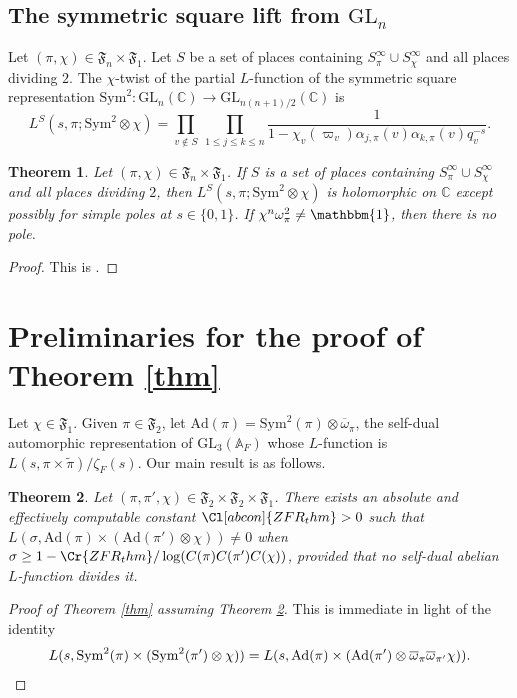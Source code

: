 \documentclass[11pt]{amsart}
\newtheorem{theorem}{Theorem}[section]
\theoremstyle{remark}
\numberwithin{equation}{section}
\begin{document}
\subsection{The symmetric square lift from $\mathrm{GL}_n$}

Let $(\pi,\chi)\in\mathfrak{F}_{n}\times\mathfrak{F}_{1}$.  Let $S$ be a set of places containing $S_{\pi}^{\infty}\cup S_{\chi}^{\infty}$ and all places dividing $2$.  The $\chi$-twist of the partial $L$-function of the symmetric square representation $\mathrm{Sym}^2\colon \mathrm{GL}_n(\mathbb{C})\to\mathrm{GL}_{n(n+1)/2}(\mathbb{C})$ is
\begin{equation}
\label{eqn:SYM2def}
L^S(s,\pi;\mathrm{Sym}^2\otimes\chi)=\prod_{v\notin S}~\prod_{1\leq j\leq k\leq n}\frac{1}{1-\chi_v(\varpi_v)\alpha_{j,\pi}(v)\alpha_{k,\pi}(v)q_v^{-s}}.
\end{equation}
\begin{theorem}
\label{thm:sym2}
Let $(\pi,\chi)\in\mathfrak{F}_{n}\times\mathfrak{F}_{1}$.  If $S$ is a set of places containing $S_{\pi}^{\infty}\cup S_{\chi}^{\infty}$ and all places dividing $2$, then $L^S(s,\pi;\mathrm{Sym}^2\otimes\chi)$ is holomorphic on $\mathbb{C}$ except possibly for simple poles at $s\in\{0,1\}$.  If $\chi^n \omega_{\pi}^2\neq\mathbbm{1}$, then there is no pole.
\end{theorem}
\begin{proof}
This is \cite[Theorem 7.1]{Takeda}.
\end{proof}

\section{Preliminaries for the proof of Theorem \ref{thm}}
\label{sec:strategy}

Let $\chi\in\mathfrak{F}_1$.  Given $\pi\in\mathfrak{F}_2$, let $\mathrm{Ad}(\pi)=\mathrm{Sym}^2(\pi)\otimes\overline{\omega}_{\pi}$, the self-dual automorphic representation of $\mathrm{GL}_3(\mathbb{A}_F)$ whose $L$-function is $L(s,\pi\times\tilde{\pi})/\zeta_F(s)$.  Our main result is as follows.
\begin{theorem}
\label{thm:Ad}
Let $(\pi,\pi',\chi)\in\mathfrak{F}_{2}\times\mathfrak{F}_{2}\times\mathfrak{F}_{1}$.  There exists an absolute and effectively computable constant $\Cl[abcon]{ZFR_thm}>0$ such that $L(\sigma,\mathrm{Ad}(\pi)\times(\mathrm{Ad}(\pi')\otimes\chi))\neq 0$ when $\sigma\geq 1-\Cr{ZFR_thm}/\log(C(\pi)C(\pi')C(\chi))$,  provided that no self-dual abelian $L$-function divides it.
\end{theorem}
\begin{proof}[Proof of Theorem \ref{thm} assuming Theorem \ref{thm:Ad}]
This is immediate in light of the identity
\[
L(s,\mathrm{Sym}^2(\pi)\times(\mathrm{Sym}^2(\pi')\otimes\chi))=L(s,\mathrm{Ad}(\pi)\times(\mathrm{Ad}(\pi')\otimes\overline{\omega}_{\pi}\overline{\omega}_{\pi'}\chi)).\qedhere
\]	
\end{proof}
\end{document}
